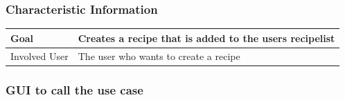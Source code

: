\documentclass[12pt]{article}
\theoremstyle{definition}
\begin{document}
\subsubsection{Characteristic Information}

\begin{tabular}{|l|l|}
\hline
Goal & Creates a recipe that is added to the users recipelist  \\ \hline
Involved User & The user who wants to create a recipe \\ \hline
\end{tabular}
\pagebreak
\subsubsection{GUI to call the use case}
\begin{figure}[!h]
           \begin{floatrow}

\end{floatrow}
\end{figure}
\end{document}
